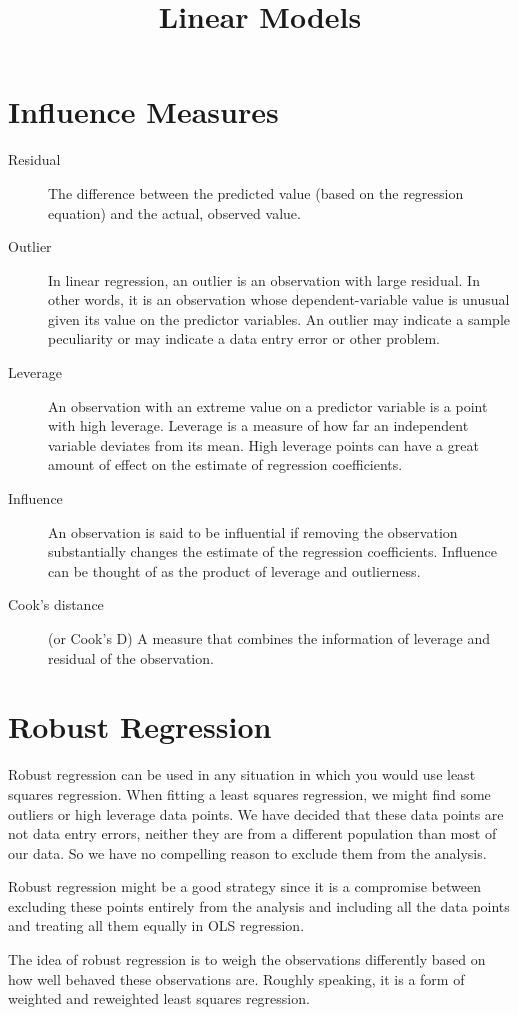 \documentclass[12pt]{article}
\title{Linear Models}
\begin{document}
\section*{Influence Measures}
\begin{description}
\item[Residual]  The difference between the predicted value (based on the regression equation) and the actual, observed value.

\item[Outlier]  In linear regression, an outlier is an observation with large residual.  In other words, it is an observation whose dependent-variable value is unusual given its value on the predictor variables.  An outlier may indicate a sample peculiarity or may indicate a data entry error or other problem.

\item[Leverage]  An observation with an extreme value on a predictor variable is a point with high leverage.  Leverage is a measure of how far an independent variable deviates from its mean.  High leverage points can have a great amount of effect on the estimate of regression coefficients.

\item[Influence]  An observation is said to be influential if removing the observation substantially changes the estimate of the regression coefficients.  Influence can be thought of as the product of leverage and outlierness. 

\item[Cook's distance] (or Cook's D) A measure that combines the information of leverage and residual of the observation.
\end{description} 
\newpage
\section*{Robust Regression}

Robust regression can be used in any situation in which you would use least squares regression.  When fitting a least squares regression, we might find some outliers or high leverage data points.  We have decided that these data points are not data entry errors, neither they are from a different population than most of our data. So we have no compelling reason to exclude them from the analysis.  

Robust regression might be a good strategy since it is a compromise between excluding these points entirely from the analysis and including all the data points and treating all them equally in OLS regression. 

The idea of robust regression is to weigh the observations differently based on how well behaved these observations are. Roughly speaking, it is a form of weighted and reweighted least squares regression. 
\end{document}
